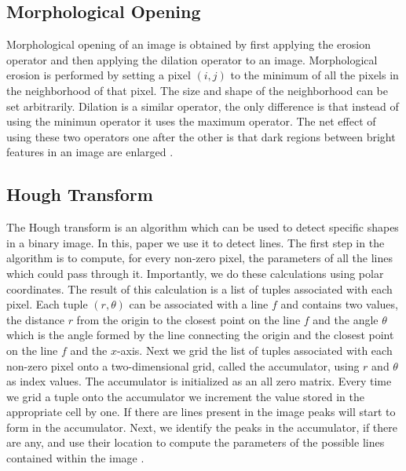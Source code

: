 \documentclass{article}
\begin{document}
\subsection{Morphological Opening}
Morphological opening of an image is obtained by first applying the erosion operator and then applying the dilation operator to an image. 
Morphological erosion is performed by setting a pixel $(i,j)$ to the minimum of all the pixels in the neighborhood of that pixel. The size 
and shape of the neighborhood can be set arbitrarily. Dilation is a similar operator,
the only difference is that instead of using the minimun operator it uses the maximum operator. The net effect of using these two operators one after the other is that dark regions between bright features in an image are enlarged \cite{soille2013}. 

\subsection{Hough Transform}
The Hough transform is an algorithm which can be used to detect specific shapes in a binary image. In this, paper we use it to detect lines. 
The first step in the algorithm is to compute, for every non-zero pixel, the parameters of all the lines which could pass through it. Importantly, we do these calculations using polar coordinates. 
The result of this calculation is a list of tuples associated with each pixel. Each tuple $(r,\theta)$ can be associated with a line $f$ and contains two values, 
the distance $r$ from the origin to the closest point on the line $f$ and the angle $\theta$ which is the angle formed by the line 
connecting the origin and the closest point on the line $f$ and the $x$-axis. Next we grid the list of tuples associated with each non-zero pixel onto a two-dimensional 
grid, called the accumulator, using $r$ and $\theta$ as index values. The accumulator is initialized as an all zero matrix. Every time we grid a tuple onto the accumulator 
we increment the value stored in the appropriate cell by one. If there are lines present in the image peaks will start to form in the accumulator. Next, we 
identify the peaks in the accumulator, if there are any, and use their location to compute the parameters of the possible lines contained within the image \cite{illingworth1988}. 
\end{document}
